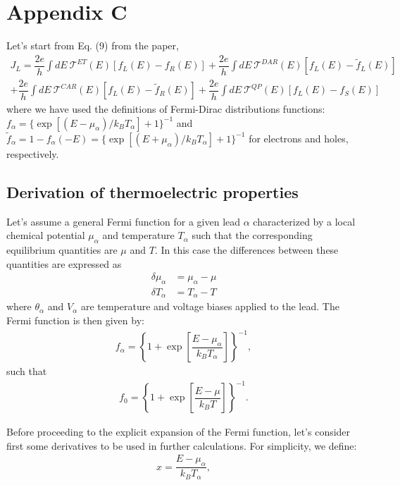 \section{Appendix C}

Let's start from Eq. (9) from the paper, 
\begin{multline}\label{current}
J_{L}
=
\dfrac{2e}{h}\int dE~\mathcal{T}^{ET}(E)[f_{L}(E)-f_{R}(E)]
+
\dfrac{2e}{h}\int dE~\mathcal{T}^{DAR}(E)[f_{L}(E)-\tilde{f}_{L}(E)]
\\+
\dfrac{2e}{h}\int dE~\mathcal{T}^{CAR}(E)[f_{L}(E)-\tilde{f}_{R}(E)]
+
\dfrac{2e}{h}\int dE~\mathcal{T}^{QP}(E)[f_{L}(E)-f_{S}(E)]
\end{multline}
where we have used the definitions of Fermi-Dirac distributions functions: $f_{\alpha}=\{\exp[(E-\mu_{\alpha})/k_{B}T_{\alpha}]+1\}^{-1}$ and $\tilde{f}_{\alpha}=1-f_{\alpha}(-E)=\{\exp[(E+\mu_{\alpha})/k_{B}T_{\alpha}]+1\}^{-1}$ for electrons and holes, respectively.


\subsection{Derivation of thermoelectric properties}


Let's assume a general Fermi function for a given lead $\alpha$ characterized by a local chemical potential $\mu_{\alpha}$ and temperature $T_{\alpha}$ such that the corresponding equilibrium quantities are $\mu$ and $T$. In this case the differences between these quantities are expressed as
\begin{align*}
\delta\mu_{\alpha}&=\mu_{\alpha}-\mu
\\
\delta T_{\alpha}&=T_{\alpha}-T
\end{align*}
where $\theta_{\alpha}$ and $V_{\alpha}$ are temperature and voltage biases applied to the lead. The Fermi function is then given by:
\begin{align*}
f_{\alpha}=\left\{1+\exp\left[\dfrac{E-\mu_{\alpha}}{k_{B}T_{\alpha}}\right]\right\}^{-1},
\end{align*}
such that
\begin{align*}
f_{0}=\left\{1+\exp\left[\dfrac{E-\mu}{k_{B}T}\right]\right\}^{-1}.
\end{align*}

Before proceeding to the explicit expansion of the Fermi function, let's consider first some derivatives to be used in further calculations. For simplicity, we define:
\begin{align*}
x=\dfrac{E-\mu_{\alpha}}{k_{B}T_{\alpha}},
\end{align*}

